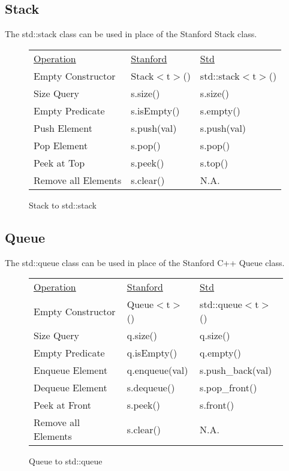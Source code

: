 \documentclass[nobib]{tufte-handout}
\begin{document}
\subsection*{Stack}

The std::stack class can be used in place of the Stanford Stack class.

\begin{figure}[!htbp]
\begin{tabular}{lll}
  \underline{Operation} & \underline{Stanford} & \underline{Std} \\
  Empty Constructor & Stack$<$t$>$() & std::stack$<$t$>$() \\ %
  Size Query & s.size() & s.size() \\ %
  Empty Predicate & s.isEmpty() & s.empty() \\ %
  Push Element & s.push(val) & s.push(val) \\ %
  Pop Element & s.pop() & s.pop() \\ %
  Peek at Top & s.peek() & s.top() \\ %
  Remove all Elements & s.clear() & N.A. \\ %
\end{tabular}
\caption{Stack to std::stack}
\end{figure}

\newpage \thispagestyle{empty}

\subsection*{Queue}

The std::queue class can be used in place of the Stanford C++ Queue class.

\begin{figure}[!htbp]
\begin{tabular}{lll}
  \underline{Operation} & \underline{Stanford} & \underline{Std} \\
  Empty Constructor & Queue$<$t$>$() & std::queue$<$t$>$() \\ %
  Size Query & q.size() & q.size() \\ %
  Empty Predicate & q.isEmpty() & q.empty() \\ %
  Enqueue Element & q.enqueue(val) & s.push\_back(val) \\ %
  Dequeue Element & s.dequeue() & s.pop\_front() \\ %
  Peek at Front & s.peek() & s.front() \\ %
  Remove all Elements & s.clear() & N.A. \\ %
\end{tabular}
\caption{Queue to std::queue}
\end{figure}
\end{document}
